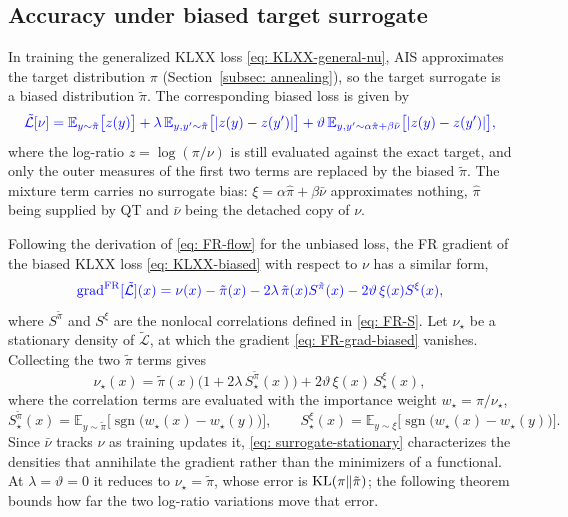 \documentclass{article}
\begin{document}
\subsection{Accuracy under biased target surrogate}

In training the generalized KLXX loss \eqref{eq: KLXX-general-nu}, AIS approximates the target distribution $\pi$ (Section~\ref{subsec: annealing}), so the target surrogate is a biased distribution $\tilde\pi$. The corresponding biased loss is given by
\begin{equation}
	\color{blue}\tilde{\mathcal L}[\nu] = \mathbb E_{y\sim\tilde\pi}\big[z(y)\big] +  \lambda\, \mathbb E_{y,y'\sim\tilde\pi}\big[|z(y)-z(y')|\big] + \vartheta\, \mathbb E_{y,y'\sim \alpha\hat\pi+\beta\bar\nu}\big[|z(y)-z(y')|\big],
	\label{eq: KLXX-biased}
\end{equation}
where the log-ratio $z=\log(\pi/\nu)$ is still evaluated against the exact target{\color{blue},} and only the outer measures of the first two terms are replaced {\color{blue} by the biased $\tilde\pi$}. The mixture term carries no surrogate bias: $\xi=\alpha\hat\pi+\beta\bar\nu$ approximates nothing, $\hat\pi$ being supplied by QT and $\bar\nu$ being the detached copy of $\nu$.

{\color{blue}Following the derivation of \eqref{eq: FR-flow} for the unbiased loss, the FR gradient of the biased KLXX loss \eqref{eq: KLXX-biased} with respect to $\nu$ has a similar form,}
\begin{equation}
	\color{blue}\mathrm{grad}^{\mathrm{FR}}[\tilde{\mathcal L}](x) = \nu(x)-\tilde\pi(x) - 2\lambda\,\tilde\pi(x)S^{\tilde\pi}(x) - 2\vartheta\,\xi(x)S^{\xi}(x),
	\label{eq: FR-grad-biased}
\end{equation}
{\color{blue}where $S^{\tilde\pi}$ and $S^{\xi}$ are the nonlocal correlations defined in \eqref{eq: FR-S}.}
{\color{blue}Let $\nu_\star$ be a stationary density of $\tilde {\mathcal L}$, at which the gradient \eqref{eq: FR-grad-biased} vanishes. Collecting the two $\tilde\pi$ terms gives}
\begin{equation}
	\nu_\star(x) = \tilde\pi(x)\bigl(1 + 2\lambda\,S^{\tilde\pi}_\star(x)\bigr) + 2\vartheta\,\xi(x)\,S^{\xi}_\star(x),
	\label{eq: surrogate-stationary}
\end{equation}
where the correlation terms are evaluated with the importance weight $w_\star=\pi/\nu_\star$,
\begin{equation}
	S^{\tilde\pi}_\star(x) = \mathbb E_{y\sim\tilde\pi}\bigl[\operatorname{sgn}\bigl(w_\star(x)-w_\star(y)\bigr)\bigr],
	\qquad
	S^{\xi}_\star(x) = \mathbb E_{y\sim\xi}\bigl[\operatorname{sgn}\bigl(w_\star(x)-w_\star(y)\bigr)\bigr].
\end{equation}
Since $\bar\nu$ tracks $\nu$ as training updates it, \eqref{eq: surrogate-stationary} characterizes the densities that annihilate the gradient rather than the minimizers of a functional. At $\lambda=\vartheta=0$ it reduces to $\nu_\star=\tilde\pi$, whose error is $\mathrm{KL}(\pi\|\tilde\pi)$; the following theorem bounds how far the two log-ratio variations move that error.
\end{document}
